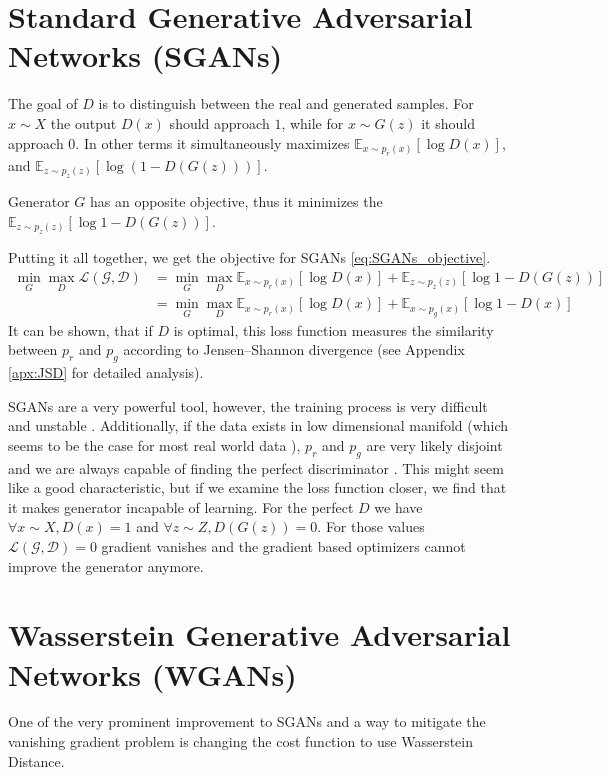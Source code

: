 \section{Standard Generative Adversarial Networks (SGANs)}
The goal of $D$ is to distinguish between the real and generated samples. For $x
\sim X$ the output $D(x)$ should approach $1$, while for $x \sim G(z)$ it should
approach $0$. In other terms it simultaneously maximizes $\mathbb{E}_{x \sim
  p_r(x)}[\log{D(x)}]$, and $\mathbb{E}_{z \sim p_z(z)}[\log{(1 - D(G(z)))}]$.

Generator $G$ has an opposite objective, thus it minimizes the $\mathbb{E}_{z
  \sim p_z(z)}[\log{1 - D(G(z))}]$.

Putting it all together, we get the objective for SGANs \ref{eq:SGANs_objective}.
\begin{equation}
  \label{eq:SGANs_objective}
  \begin{split}
    \min_G\max_D\mathcal{L(G, D)} & = \min_G\max_D \mathbb{E}_{x \sim p_r(x)}[\log{D(x)}] +  \mathbb{E}_{z \sim p_z(z)}[\log{1 - D(G(z))}] \\
    & = \min_G\max_D \mathbb{E}_{x \sim p_r(x)}[\log{D(x)}] +  \mathbb{E}_{x \sim p_g(x)}[\log{1 - D(x)}]
  \end{split}
\end{equation}
It can be shown, that if $D$ is optimal, this loss function measures the similarity between 
$p_r$ and $p_g$ according to Jensen–Shannon divergence (see Appendix
\ref{apx:JSD} for detailed analysis). 

SGANs are a very powerful tool, however, the training process is very difficult
and unstable \cite{salimans2016improved}. Additionally, if the data exists in
low dimensional manifold (which seems to be the case for most real world data
\cite{narayanan2010proceedings}), $p_r$ and $p_g$ are very likely disjoint and we are always capable of finding the perfect discriminator 
\cite{arjovsky2017principled}. This might seem like a good
characteristic, but if we examine the loss function closer, we find that it
makes generator incapable of learning. For the perfect $D$ we have $\forall x
\sim X, D(x) = 1$ and $\forall z \sim Z, D(G(z)) = 0$. For those values
$\mathcal{L(G,D)} = 0$ gradient vanishes and the gradient based optimizers cannot improve the
generator anymore.
\section{Wasserstein Generative Adversarial Networks (WGANs)}
One of the very prominent improvement to SGANs and a way to mitigate the
vanishing gradient problem is changing the cost function to use Wasserstein
Distance.

